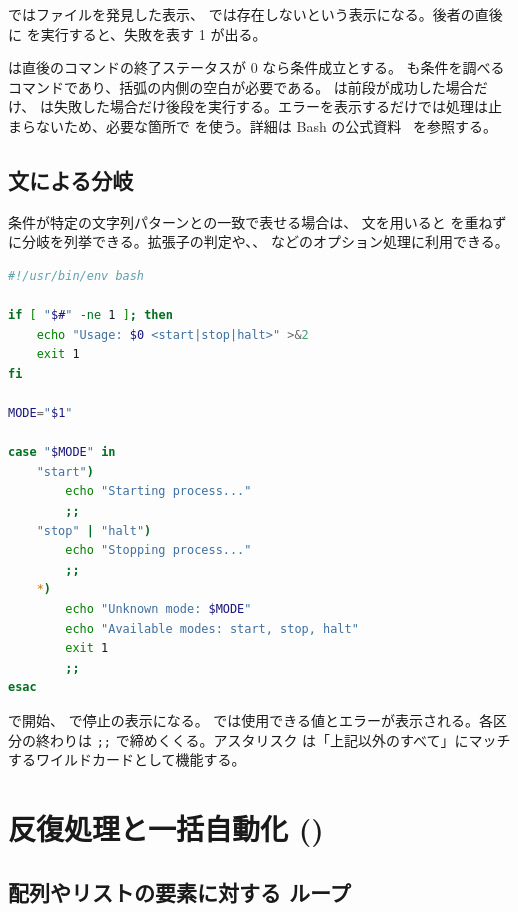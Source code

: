  ではファイルを発見した表示、 では存在しないという表示になる。後者の直後に  を実行すると、失敗を表す 1 が出る。

 は直後のコマンドの終了ステータスが 0 なら条件成立とする。\code{[ ... ]} も条件を調べるコマンドであり、括弧の内側の空白が必要である。 は前段が成功した場合だけ、 は失敗した場合だけ後段を実行する。エラーを表示するだけでは処理は止まらないため、必要な箇所で  を使う。詳細は Bash の公式資料~\cite{bash_manual} を参照する。

\subsection{ 文による分岐}

条件が特定の文字列パターンとの一致で表せる場合は、 文を用いると  を重ねずに分岐を列挙できる。拡張子の判定や、、 などのオプション処理に利用できる。

\begin{lstlisting}[language=bash]
#!/usr/bin/env bash

if [ "$#" -ne 1 ]; then
    echo "Usage: $0 <start|stop|halt>" >&2
    exit 1
fi

MODE="$1"

case "$MODE" in
    "start")
        echo "Starting process..."
        ;;
    "stop" | "halt")
        echo "Stopping process..."
        ;;
    *)
        echo "Unknown mode: $MODE"
        echo "Available modes: start, stop, halt"
        exit 1
        ;;
esac
\end{lstlisting}

 で開始、 で停止の表示になる。 では使用できる値とエラーが表示される。各区分の終わりは \verb|;;| で締めくくる。アスタリスク \code{*} は「上記以外のすべて」にマッチするワイルドカードとして機能する。

\section{反復処理と一括自動化 ()}

\subsection{配列やリストの要素に対する  ループ}

